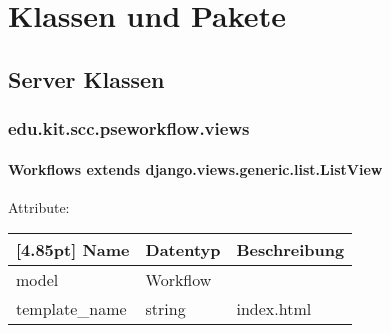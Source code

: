 \chapter{Klassen und Pakete}

%            


%

    \section{Server Klassen}

    \subsection{edu.kit.scc.pseworkflow.views}

		\subsubsection{Workflows\newline
		extends django.views.generic.list.ListView}

        Attribute:
        \begin{center}
        	\renewcommand{\arraystretch}{1.5}
            \setlength\tabcolsep{5pt}
        	\begin{tabularx}{\textwidth}{|l|l|X|}
        		\hline
                \rowcolor[gray]{0.75}[4.85pt]            		
        	    Name & Datentyp & Beschreibung \\ \hline
        	    model & Workflow &  \\ \hline
        		template_name & string & index.html \\ \hline				
        	\end{tabularx}
        \end{center}

